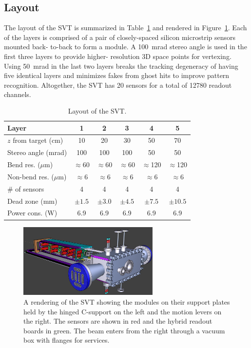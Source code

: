 \documentclass[final,3p,times,twocolumn]{elsarticle}
\begin{document}
\subsection{Layout}
The layout of the SVT is summarized in Table~\ref{tab:trk} and rendered in Figure~\ref{fig:tracker_model}. 
Each of the layers is comprised of a pair of closely-spaced silicon microstrip sensors mounted back-
to-back to form a module. A 100~mrad stereo angle is used in the first three layers to provide higher-
resolution 3D space points for vertexing.  Using 50~mrad in the last two layers breaks the tracking 
degeneracy of having five identical layers and minimizes fakes from ghost hits to improve pattern 
recognition. Altogether, the SVT has 20 sensors for a total of 12780 readout channels. 
\begin{center}
\begin{table}[ht]
{\footnotesize
\begin{tabular}{lccccc}   
\hline \hline 
    Layer & 1 & 2 & 3 & 4 & 5 \\      
\hline
    $z$ from target (cm)  & 10 & 20 & 30 & 50 & 70  \\ 
    Stereo angle (mrad)  & 100 & 100 & 100 & 50 & 50 \\ 
    Bend res. ($\mu$m)  & $\approx$60 & $\approx$60 & $\approx$60 & $\approx$120 & $\approx$120  \\ 
    Non-bend res. ($\mu$m)  & $\approx$6 & $\approx$6 & $\approx$6 & $\approx$6 & $\approx$6  \\ 
    \# of sensors  & 4 & 4 & 4 & 4 & 4  \\ 
    Dead zone (mm) & $\pm1.5$  & $\pm3.0$  & $\pm4.5$  & $\pm7.5$  & $\pm10.5$  \\ 
    Power cons. (W) & 6.9 & 6.9 & 6.9 & 6.9 & 6.9 \\
\hline \hline
\end{tabular}
\caption{\small Layout of the SVT.
\label{tab:trk}}
}
\end{table}
\end{center}
\begin{center}
\begin{figure}[htp]
\includegraphics[width=7cm]{HPS_nochamber}
\caption{\small A rendering of the SVT showing the modules on their support plates held by the 
hinged C-support on the left and the motion levers on the right. The sensors are shown in red and the 
hybrid readout boards in green. The beam enters from the right through a vacuum box with flanges 
for services. 
\label{fig:tracker_model}}
\end{figure}
\end{center}
\end{document}
